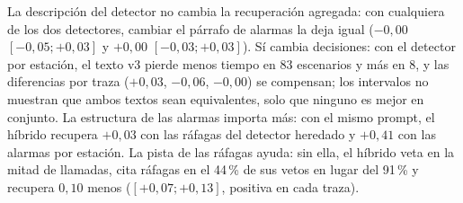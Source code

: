\documentclass[preprint,11pt]{elsarticle}
\begin{document}
\begin{table}[t]
\centering
\caption{Ablaciones del planificador híbrido sobre Claude Fable 5.1, trazas reservadas, recuperación neta a 24~h con intervalo bootstrap al 95\,\% estratificado por traza. Texto de alarmas: el párrafo del prompt que describe el detector (v2: heredado; v3: por estación). Pista de ráfagas: la mención, en el prompt del híbrido, de ``a burst of alarms shared by many stations at once'' entre las razones para dudar del test. Primera fila: la configuración de las tablas~\ref{tab:heldout}--\ref{tab:stats}.}
\label{tab:ablation}
\small
{}
\end{table}

La descripción del detector no cambia la recuperación agregada: con cualquiera de los dos detectores, cambiar el párrafo de alarmas la deja igual ($-0{,}00$ $[-0{,}05; +0{,}03]$ y $+0{,}00$ $[-0{,}03; +0{,}03]$). Sí cambia decisiones: con el detector por estación, el texto v3 pierde menos tiempo en 83 escenarios y más en 8, y las diferencias por traza ($+0{,}03$, $-0{,}06$, $-0{,}00$) se compensan; los intervalos no muestran que ambos textos sean equivalentes, solo que ninguno es mejor en conjunto. La estructura de las alarmas importa más: con el mismo prompt, el híbrido recupera $+0{,}03$ con las ráfagas del detector heredado y $+0{,}41$ con las alarmas por estación. La pista de las ráfagas ayuda: sin ella, el híbrido veta en la mitad de llamadas, cita ráfagas en el 44\,\% de sus vetos en lugar del 91\,\% y recupera $0{,}10$ menos ($[+0{,}07; +0{,}13]$, positiva en cada traza).
\end{document}
